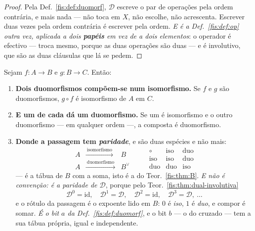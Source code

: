 \documentclass[livro.tex]{subfiles}
\begin{document}
\begin{proof}
Pela Def.~\ref{fis:def:duomorf}, $\mathcal{D}$ escreve o par de operações pela
ordem contrária, e mais nada --- não toca em $X$, não escolhe, não acrescenta.
Escrever duas vezes pela ordem contrária é escrever pela ordem. \emph{E é a
Def.~\ref{fis:def:op} outra vez, aplicada a dois \textbf{papéis} em vez de a dois
elementos}: o operador é efectivo --- troca mesmo, porque as duas operações são
duas --- e é involutivo, que são as duas cláusulas que lá se pedem.
\end{proof}

\begin{teorema}\label{fis:thm:duo-composicao}
Sejam $f\colon A\to B$ e $g\colon B\to C$. Então:
\begin{enumerate}\itemsep3pt
\item[(1)] \textbf{Dois duomorfismos compõem-se num isomorfismo.} Se $f$ e $g$
são duomorfismos, $g\circ f$ é isomorfismo de $A$ em $C$.
\item[(2)] \textbf{E um de cada dá um duomorfismo.} Se um é isomorfismo e o outro
duomorfismo --- em qualquer ordem ---, a composta é duomorfismo.
\item[(3)] \textbf{Donde a passagem tem \emph{paridade}}, e são duas espécies e
não mais:
\[
\boxed{
\begin{array}{ccl}
A&\xrightarrow{\ \text{isomorfismo}\ }&B\\[2pt]
A&\xrightarrow{\ \text{duomorfismo}\ }&B^{\vee}
\end{array}}
\qquad
\begin{array}{c|cc}
\circ & \text{iso} & \text{duo}\\\hline
\text{iso} & \text{iso} & \text{duo}\\
\text{duo} & \text{duo} & \text{iso}
\end{array}
\]
--- é a tábua de $B$ com a soma, isto é a do Teor.~\ref{fis:thm:B}. \emph{E não é
convenção: é a paridade de $\mathcal{D}$}, porque pelo
Teor.~\ref{fis:thm:dual-involutiva}
\[
\mathcal{D}^{0}=\mathrm{id},\quad \mathcal{D}^{1}=\mathcal{D},\quad
\mathcal{D}^{2}=\mathrm{id},\quad \mathcal{D}^{3}=\mathcal{D},\ \dots
\]
e o rótulo da passagem é o expoente lido em $B$: $0$ é \emph{iso}, $1$ é
\emph{duo}, e compor é somar. \emph{É o bit $a$ da Def.~\ref{fis:def:duomorf}}, e
o bit $b$ --- o do cruzado --- tem a sua tábua própria, igual e independente.
\end{enumerate}
\end{teorema}
\end{document}
